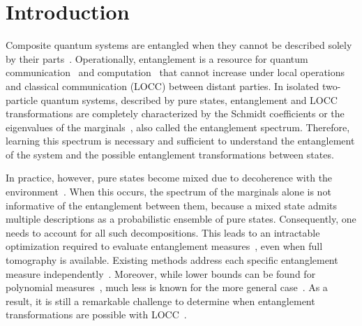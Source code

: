 \documentclass[11pt,a4paper]{report}
\begin{document}
\chapter{Introduction}\label{ch:intro}

Composite quantum systems are entangled when they cannot be described solely by their parts~\cite{epr}. Operationally, entanglement is a resource for quantum communication~\cite{distributed, eckert} and computation~\cite{one-way, shor} that cannot increase under local operations and classical communication (LOCC) between distant parties.
In isolated two-particle quantum systems, described by pure states, entanglement and LOCC transformations are completely characterized by
the Schmidt coefficients or the eigenvalues of the marginals~\cite{Nielsen1999MajLOCC, Vidal_2000}, also called
the entanglement spectrum. Therefore, learning this spectrum is
necessary and sufficient to understand the entanglement of the
system and the possible entanglement transformations between
states.

In practice, however, pure states become mixed due to decoherence with the environment~\cite{Zurek2003,BreuerPetruccione2002,NielsenChuang2010}. When this occurs, the spectrum of the marginals alone is not informative of the entanglement between them, because a mixed state admits multiple descriptions as a probabilistic ensemble of pure states. Consequently,
one needs to account for all such decompositions. This leads to an intractable optimization required to evaluate entanglement measures~\cite{Bennett1996EoF, Uhlmann1998, Uhlmann2010Roofs, Horodecki2009RMP}, even when full tomography is available.
Existing methods address each specific entanglement measure independently~\cite{Wootters1998, TerhalVollbrecht2000, VollbrechtWerner2001, Mintert2004Concurrence, Chen2005Concurrence, Chen2005EoF, Guhne2007Estimating, Eisert2007QuantWitness}. Moreover, while lower bounds can be found for polynomial measures~\cite{Toth2015CroofTP}, much less is known for the more general case~\cite{PlenioVirmani2007}. As a result, it is still a remarkable challenge to determine when entanglement transformations are possible with LOCC~\cite{Gour2005InfiniteConditions, Chitambar2014LOCC, Sauerwein_2018}.
\end{document}
